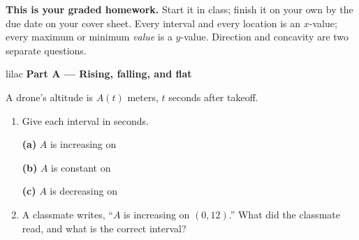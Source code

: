 \documentclass[10pt]{article}
\begin{document}

\vspace{0.12in}

\boxguard[8]
\begin{remindbox}
\small
\textbf{This is your graded homework.} Start it in class; finish it on your own by the due
date on your cover sheet. Every interval and every location is an $x$-value; every maximum or
minimum \emph{value} is a $y$-value. Direction and concavity are two separate questions.
\end{remindbox}

\vspace{0.12in}

\begin{headlinebox}{lilac}
\textbf{\color{plum}Part A --- Rising, falling, and flat}
\end{headlinebox}

\vspace{0.06in}

\noindent\begin{minipage}[t]{0.40\linewidth}
\vspace{0pt}
\centering
{}
\end{minipage}\hfill
\begin{minipage}[t]{0.57\linewidth}
\vspace{0pt}
A drone's altitude is $A(t)$ meters, $t$ seconds after takeoff.
\begin{enumerate}[leftmargin=1.9em, itemsep=8pt]
\item Give each interval in seconds.

      \textbf{(a)} $A$ is increasing on \hfill {}

      \textbf{(b)} $A$ is constant on \hfill {}

      \textbf{(c)} $A$ is decreasing on \hfill {}

\item A classmate writes, ``$A$ is increasing on $(0, 12)$.'' What did the classmate read,
      and what is the correct interval?
\end{enumerate}
\end{minipage}
\end{document}
